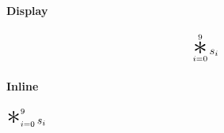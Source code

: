 \documentclass{article}
\newcommand{\bigstar}{%
  \mathop{\Huge\mathlarger{\mathlarger{*}}}%
}
\begin{document}
\paragraph{Display}

\[ \bigstar_{i = 0}^{9} s_i \]


\paragraph{Inline}

$\bigstar_{i = 0}^{9} s_i$
\end{document}
